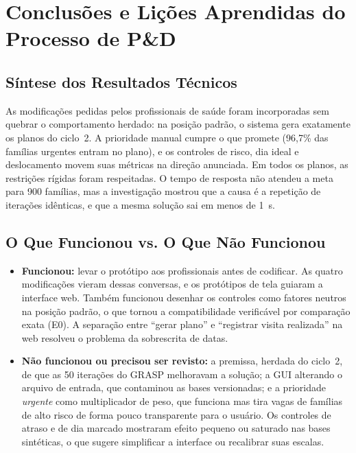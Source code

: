\documentclass[11pt,a4paper]{article}
\begin{document}
\section{Conclusões e Lições Aprendidas do Processo de P\&D}

\subsection{Síntese dos Resultados Técnicos}
As modificações pedidas pelos profissionais de saúde foram incorporadas sem quebrar o comportamento herdado: na posição padrão, o sistema gera exatamente os planos do ciclo~2. A prioridade manual cumpre o que promete (96,7\% das famílias urgentes entram no plano), e os controles de risco, dia ideal e deslocamento movem suas métricas na direção anunciada. Em todos os planos, as restrições rígidas foram respeitadas. O tempo de resposta não atendeu a meta para 900 famílias, mas a investigação mostrou que a causa é a repetição de iterações idênticas, e que a mesma solução sai em menos de 1~s.

\subsection{O Que Funcionou vs. O Que Não Funcionou}
\begin{itemize}
    \item \textbf{Funcionou:} levar o protótipo aos profissionais antes de codificar. As quatro modificações vieram dessas conversas, e os protótipos de tela guiaram a interface web. Também funcionou desenhar os controles como fatores neutros na posição padrão, o que tornou a compatibilidade verificável por comparação exata (E0). A separação entre ``gerar plano'' e ``registrar visita realizada'' na web resolveu o problema da sobrescrita de datas.
    \item \textbf{Não funcionou ou precisou ser revisto:} a premissa, herdada do ciclo~2, de que as 50 iterações do GRASP melhoravam a solução; a GUI alterando o arquivo de entrada, que contaminou as bases versionadas; e a prioridade \emph{urgente} como multiplicador de peso, que funciona mas tira vagas de famílias de alto risco de forma pouco transparente para o usuário. Os controles de atraso e de dia marcado mostraram efeito pequeno ou saturado nas bases sintéticas, o que sugere simplificar a interface ou recalibrar suas escalas.
\end{itemize}
\end{document}
